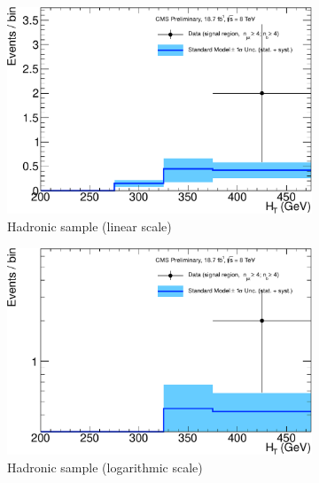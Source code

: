 \clearpage
\begin{figure}[h!]
  \centering
  \begin{subfigure}[b]{0.48\textwidth}
    \includegraphics[width=\textwidth]
    {Figs/results/v0/blueBand/single_plots/hadronic_ge4b_ge4j.pdf}
    \caption{Hadronic sample (linear scale)}
  \end{subfigure}
  \vspace{0.7cm}\begin{subfigure}[b]{0.48\textwidth}
    \includegraphics[width=\textwidth]
    {Figs/results/v0/blueBand/single_plots/hadronic_ge4b_ge4j_logy.pdf}
    \caption{Hadronic sample (logarithmic scale)}
  \end{subfigure}
  \begin{subfigure}[b]{0.48\textwidth}

\end{subfigure}
\end{figure}
